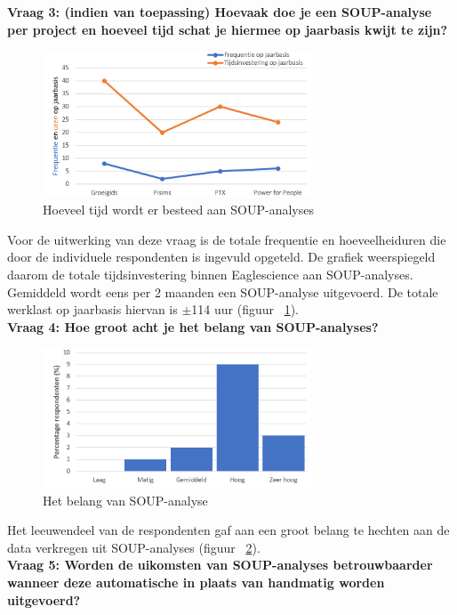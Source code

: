 \textbf{Vraag 3: (indien van toepassing) Hoevaak doe je een SOUP-analyse per project en hoeveel tijd schat je hiermee op jaarbasis kwijt te zijn?}\\
\begin{figure}[bth]
    \centering
    \includegraphics[width=8cm]{gfx/appendix/Vraag3}
    \caption{Hoeveel tijd wordt er besteed aan SOUP-analyses}
    \label{fig:enqueteV3}
\end{figure}

Voor de uitwerking van deze vraag is de totale frequentie en hoeveelheiduren die door de individuele respondenten is ingevuld opgeteld. De grafiek weerspiegeld daarom de totale tijdsinvestering binnen Eaglescience aan SOUP-analyses. Gemiddeld wordt eens per 2 maanden een SOUP-analyse uitgevoerd. De totale werklast op jaarbasis hiervan is $\pm$114 uur (figuur ~\ref{fig:enqueteV3}).\\

\textbf{Vraag 4: Hoe groot acht je het belang van SOUP-analyses?}\\
\begin{figure}[bth]
    \centering
    \includegraphics[width=8cm]{gfx/appendix/Vraag4}
    \caption{Het belang van SOUP-analyse}
    \label{fig:enqueteV4}
\end{figure}
Het leeuwendeel van de respondenten gaf aan een groot belang te hechten aan de data verkregen uit SOUP-analyses (figuur ~\ref{fig:enqueteV4}).\\

\textbf{Vraag 5: Worden de uikomsten van SOUP-analyses betrouwbaarder wanneer deze automatische in plaats van handmatig worden uitgevoerd?}\\

